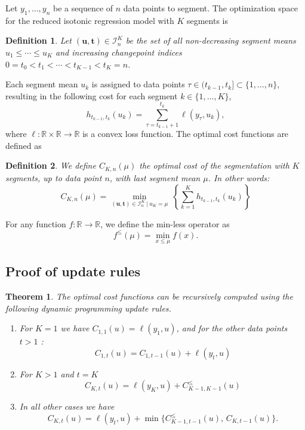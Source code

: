 \documentclass{article}
\newcommand{\FCC}{C}
\newcommand{\RR}{\mathbb R}
\newtheorem{theorem}{Theorem}
\newtheorem{definition}{Definition}
\begin{document}
Let $y_1,\dots,y_n$ be a sequence of $n$ data points to segment. The
optimization space for the reduced isotonic regression model with $K$
segments is
\begin{definition}
\label{def:Ibar}
  Let $(\mathbf u, \mathbf t)\in{\mathcal I}_n^K$ be the set of
  all non-decreasing segment means $u_1\leq\cdots\leq u_K$ and
  increasing changepoint indices $0=t_0<t_1<\cdots<t_{K-1}<t_K=n$.
\end{definition}
Each segment
mean $u_k$ is assigned to data points
$\tau\in(t_{k-1},t_k]\subset\{1,\dots,n\}$, resulting in the following
cost for each segment $k\in\{1, \dots, K\}$,
\begin{equation}
  \label{eq:h}
  h_{t_{k-1}, t_k}(u_k) = \sum_{\tau=t_{k-1}+1}^{t_k} \ell(y_\tau, u_k),
\end{equation}
where $\ell:\RR\times\RR\rightarrow\RR$ is a convex loss function.
The optimal cost functions are defined as
\begin{definition}
\label{def:fcc}
  We define $\FCC_{K,n}(\mu)$ the optimal cost of the segmentation
  with $K$ segments, up to data point $n$, with last segment mean
  $\mu$. In other words:
\begin{equation}
\FCC_{K,n}(\mu) = \min_{(\mathbf u, \mathbf t)\in{\mathcal I}_n^K \ | \ u_K = \mu} \
  \left\{ \sum_{k=1}^K
  h_{t_{k-1}, t_k}(u_k) \right\}
\end{equation}
\end{definition}
For
any function $f:\RR\rightarrow\RR$, we define the min-less operator as
\begin{equation}
  \label{eq:min-less-def}
  f^\leq(\mu)=\min_{x\leq \mu} f(x).
\end{equation}

\subsection{Proof of update rules}

\begin{theorem}
  The optimal cost functions can be recursively computed using the
  following dynamic programming update rules.
\begin{enumerate}
\item For $K=1$ we have
$\FCC_{1,1}(u)=\ell(y_1,u)$, and for the other data
  points $t>1$ :
\begin{equation}
\FCC_{1,t}(u)=\FCC_{1,t-1}(u)+\ell(y_t,u)
\end{equation}

\item For $K>1$ and $t=K$
\begin{equation}
  \FCC_{K,t}(u)=\ell(y_K, u)+\FCC_{K-1,K-1}^\leq(u)
\end{equation}
\item In all other cases we have
  \begin{equation}
  \FCC_{K,t}(u)=\ell(y_t,u)+
  \min\{
  \FCC_{K-1,t-1}^\leq(u),\,
  \FCC_{K,t-1}(u)
  \}.
  \end{equation}
\end{enumerate}
\end{theorem}
\end{document}
